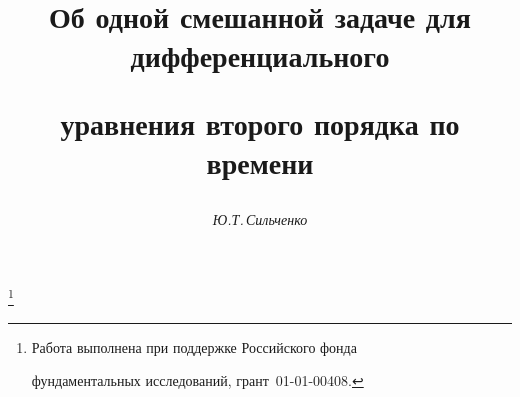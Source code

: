 

  




  


\newcommand{\re}{\operatorname{Re}}  


\newcommand{\tts}[1]{}  


  




  


\setcounter{page}{64}  












  


\author{\it Ю.Т.\,Сильченко}  




\title{Об одной смешанной задаче для дифференциального  


уравнения второго порядка по времени} 


\thanks{Работа выполнена при поддержке Российского фонда 


фундаментальных исследований, грант \No\,01-01-00408.} 


 


 


\date{}  




\pagestyle{plain} %


  


